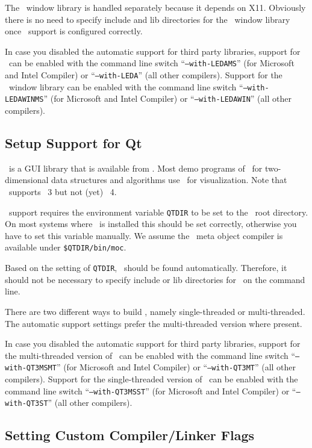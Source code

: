 The \leda\ window library is handled separately because it depends on
X11. Obviously there is no need to specify include and lib directories
for the \leda\ window library once \leda\ support is configured
correctly.

In case you disabled the automatic support for third party libraries,
support for \leda\ can be enabled with the command line switch
``\texttt{--with-LEDAMS}'' (for Microsoft and Intel Compiler) or
``\texttt{--with-LEDA}'' (all other compilers). Support for the \leda\
window library can be enabled with the command line switch
``\texttt{--with-LEDAWINMS}'' (for Microsoft and Intel Compiler) or
``\texttt{--with-LEDAWIN}'' (all other compilers).

\subsection{Setup Support for Qt\label{sec:qt-setup}}

\qt\ is a GUI library that is available from \qtpage. Most demo
programs of \cgal\ for two-dimensional data structures and algorithms
use \qt\ for visualization. Note that \cgal\ supports \qt~3 but not
(yet) \qt~4.

\qt\ support requires the environment variable \texttt{QTDIR} to be
set to the \qt\ root directory. On most systems where \qt\ is
installed this should be set correctly, otherwise you have to set this
variable manually. We assume the \qt\ meta object compiler is
available under \texttt{\${QTDIR}/bin/moc}.

Based on the setting of \texttt{QTDIR}, \qt\ should be found
automatically. Therefore, it should not be necessary to specify
include or lib directories for \qt\ on the command line.

There are two different ways to build \qt, namely single-threaded or
multi-threaded. The automatic support settings prefer the
multi-threaded version where present.

In case you disabled the automatic support for third party libraries,
support for the multi-threaded version of \qt\ can be enabled with the
command line switch ``\texttt{--with-QT3MSMT}'' (for Microsoft and
Intel Compiler) or ``\texttt{--with-QT3MT}'' (all other compilers).
Support for the single-threaded version of \qt\ can be enabled with
the command line switch ``\texttt{--with-QT3MSST}'' (for Microsoft and
Intel Compiler) or ``\texttt{--with-QT3ST}'' (all other compilers).

\subsection{Setting Custom Compiler/Linker Flags\label{sec:custom-setup}}
\index{compilers!setting custom flags}

